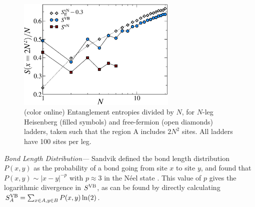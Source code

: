 \documentclass[prl,aps,twocolumn,floatfix,amsmath,amssymb,superscriptaddress,tightenlines]{revtex4}
\begin{document}

\begin{figure} { \includegraphics[width=3in]{fig4.eps} \caption{(color
online) Entanglement entropies divided by $N$,  for $N$-leg Heisenberg (filled symbols) and free-fermion (open diamonds) ladders, taken such that the region A includes $2N^2$ sites.
All ladders
have 100 sites per leg.  \label{zigzag}}} \end{figure}

{\it Bond Length Distribution---} Sandvik defined the bond length
distribution $P(x,y)$ as the probability of a bond going from site $x$ to
site $y$, and found that $P(x,y)\sim |x-y|^{-p}$ with $p\approx 3$
in the N\'eel state \cite{Sandvik}.
This value of $p$ gives the logarithmic divergence in $S^{\rm VB}$, as can be
found by directly calculating 
$S^{\rm VB}_{A}=\sum_{x\in A,y\in B} P(x,y)\ln (2)$.
\end{document}
